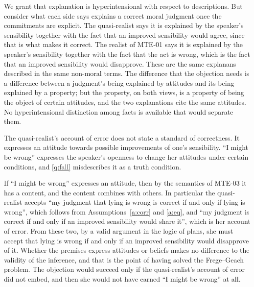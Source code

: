 \documentclass{situationist-preprint}
\begin{document}
\begin{reply}
We grant that explanation is hyperintensional with respect to descriptions. But consider what each side says explains a correct moral judgment once the commitments are explicit. The quasi-realist says it is explained by the speaker's sensibility together with the fact that an improved sensibility would agree, since that is what makes it correct. The realist of MTE-01 says it is explained by the speaker's sensibility together with the fact that the act is wrong, which is the fact that an improved sensibility would disapprove. These are the same explanans described in the same non-moral terms. The difference that the objection needs is a difference between a judgment's being explained by attitudes and its being explained by a property; but the property, on both views, is a property of being the object of certain attitudes, and the two explanations cite the same attitudes. No hyperintensional distinction among facts is available that would separate them.
\end{reply}

\begin{objection}
The quasi-realist's account of error does not state a standard of correctness. It expresses an attitude towards possible improvements of one's sensibility. \enquote{I might be wrong} expresses the speaker's openness to change her attitudes under certain conditions, and \ref{q:fall} misdescribes it as a truth condition.
\end{objection}

\begin{reply}
If \enquote{I might be wrong} expresses an attitude, then by the semantics of MTE-03 it has a content, and the content combines with others. In particular the quasi-realist accepts \enquote{my judgment that lying is wrong is correct if and only if lying is wrong}, which follows from Assumptions~\ref{a:corr} and \ref{a:eq}, and \enquote{my judgment is correct if and only if an improved sensibility would share it}, which is her account of error. From these two, by a valid argument in the logic of plans, she must accept that lying is wrong if and only if an improved sensibility would disapprove of it. Whether the premises express attitudes or beliefs makes no difference to the validity of the inference, and that is the point of having solved the Frege--Geach problem. The objection would succeed only if the quasi-realist's account of error did not embed, and then she would not have earned \enquote{I might be wrong} at all.
\end{reply}
\end{document}
